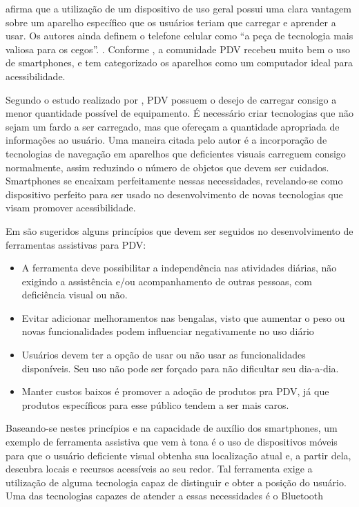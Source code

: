 \documentclass[english,brazilian]{UNISINOSmonografia}
\begin{document}
 afirma que a utilização de um dispositivo de uso geral possui uma clara vantagem sobre um aparelho específico que os usuários teriam que carregar e aprender a usar. Os autores ainda definem o telefone celular como “a peça de tecnologia mais valiosa para os cegos”. \cite{mau2008blindaid}. Conforme , a comunidade PDV recebeu muito bem o uso de smartphones, e tem categorizado os aparelhos como um computador ideal para acessibilidade.

Segundo o estudo realizado por , PDV possuem o desejo de carregar consigo a menor quantidade possível de equipamento. É necessário criar tecnologias que não sejam um fardo a ser carregado, mas que ofereçam a quantidade apropriada de informações ao usuário. Uma maneira citada pelo autor é a incorporação de tecnologias de navegação em aparelhos que deficientes visuais carreguem consigo normalmente, assim reduzindo o número de objetos que devem ser cuidados. Smartphones se encaixam perfeitamente nessas necessidades, revelando-se como dispositivo perfeito para ser usado no desenvolvimento de novas tecnologias que visam promover acessibilidade.

Em  são sugeridos alguns princípios que devem ser seguidos no desenvolvimento de ferramentas assistivas para PDV:
\begin{itemize}
	\item A ferramenta deve possibilitar a independência nas atividades diárias, não exigindo a assistência e/ou acompanhamento de outras pessoas, com deficiência visual ou não.
	\item Evitar adicionar melhoramentos nas bengalas, visto que aumentar o peso ou novas funcionalidades podem influenciar negativamente no uso diário
	\item Usuários devem ter a opção de usar ou não usar as funcionalidades disponíveis. Seu uso não pode ser forçado para não dificultar seu dia-a-dia.
	\item Manter custos baixos é promover a adoção de produtos pra PDV, já que produtos específicos para esse público tendem a ser mais caros.
\end{itemize}

Baseando-se nestes princípios e na capacidade de auxílio dos smartphones, um exemplo de ferramenta assistiva que vem à tona é o uso de dispositivos móveis para que o usuário deficiente visual obtenha sua localização atual e, a partir dela, descubra locais e recursos acessíveis ao seu redor. Tal ferramenta exige a utilização de alguma tecnologia capaz de distinguir e obter a posição do usuário. Uma das tecnologias capazes de atender a essas necessidades é o Bluetooth 
\end{document}

